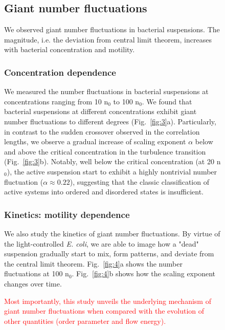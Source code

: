 \documentclass[twocolumn,aps,pre,amsmath,amssymb,floatfix,longbibliography]{revtex4-1}
\begin{document}
\begin{figure}[!]
\subsection{Giant number fluctuations}
We observed giant number fluctuations in bacterial suspensions. The magnitude, i.e. the deviation from central limit theorem, increases with bacterial concentration and motility.

\subsubsection{Concentration dependence}
We measured the number fluctuations in bacterial suspensions at concentrations ranging from 10 n$_0$ to 100 n$_0$.
 We found that bacterial suspensions at different concentrations exhibit giant number fluctuations to different degrees (Fig.~\ref{fig:3}a). Particularly, in contrast to the sudden crossover observed in the correlation lengths, we observe a gradual increase of scaling exponent $\alpha$ below and above the critical concentration in the turbulence transition (Fig.~\ref{fig:3}b). Notably, well below the critical concentration (at 20 n$_0$), the active suspension start to exhibit a highly nontrivial number fluctuation ($\alpha\approx0.22$), suggesting that the classic classification of active systems into ordered and disordered states is insufficient.

\subsubsection{Kinetics: motility dependence}
We also study the kinetics of giant number fluctuations. By virtue of the light-controlled \textit{E. coli}, we are able to image how a "dead" suspension gradually start to mix, form patterns, and deviate from the central limit theorem. Fig.~\ref{fig:4}a shows the number fluctuations at 100 n$_0$. Fig.~\ref{fig:4}b shows how the scaling exponent changes over time.

\textcolor{red}{Most importantly, this study unveils the underlying mechanism of giant number fluctuations when compared with the evolution of other quantities (order parameter and flow energy).}


\end{figure}
\end{document}
